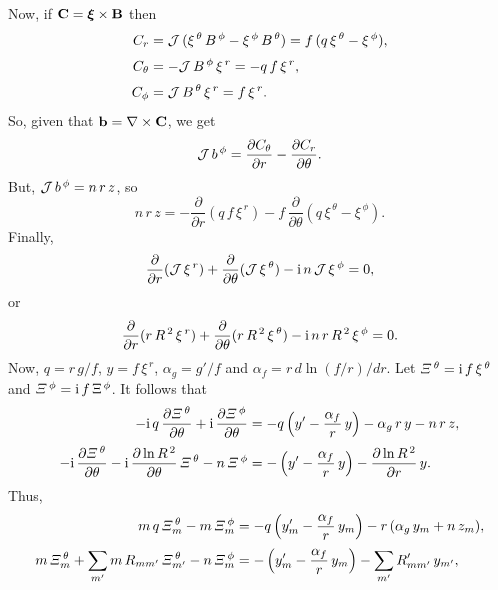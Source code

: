 \documentclass[12pt,prb,aps,notitlepage]{revtex4-1}
\newcommand{\bxi}{\mbox{\boldmath$\xi$}}
\begin{document}
Now, if ${\bf C} = \bxi\times {\bf B}$ then 
\begin{align}
C_r &= {\cal J}\,(\xi^{\,\theta}\,B^{\,\phi} - \xi^{\,\phi}\,B^{\,\theta})= f\,(q\,\xi^{\,\theta}-\xi^{\,\phi}),\\[0.5ex]
C_\theta&= - {\cal J}\,B^{\,\phi}\,\xi^{\,r}=-q\,f\,\xi^{\,r},\\[0.5ex]
C_\phi&= {\cal J}\,B^{\,\theta}\,\xi^{\,r} =f\,\xi^{\,r}.
\end{align}
So, given that ${\bf b}=\nabla\times {\bf C}$, we get
\begin{equation}
{\cal J}\,b^{\,\phi} = \frac{\partial C_\theta}{\partial r} - \frac{\partial C_r}{\partial\theta}.
\end{equation}
But, ${\cal J}\,b^{\,\phi} = n\,r\,z$,  so
\begin{equation}
n\,r\,z =- \frac{\partial}{\partial r} (q\,f\,\xi^{\,r})- f\,\frac{\partial}{\partial\theta}(q\,\xi^{\,\theta}-\xi^{\,\phi}).
\end{equation}
Finally,
\begin{equation}
\frac{\partial}{\partial r}({\cal J}\,\xi^{\,r})+\frac{\partial}{\partial\theta}({\cal J}\,\xi^{\,\theta})- {\rm i}\,n\,{\cal J}\,\xi^{\,\phi} = 0,
\end{equation}
or
\begin{equation}
\frac{\partial}{\partial r}(r\,R^{\,2}\,\xi^{\,r})+\frac{\partial}{\partial\theta}(r\,R^{\,2}\,\xi^{\,\theta})- {\rm i}\,n\,r\,R^{\,2}\,\xi^{\,\phi} = 0.
\end{equation}
Now, $q=r\,g/f$, $y = f\,\xi^{\,r}$, $\alpha_g= g'/f$ and $\alpha_f = r\,d\ln(f/r)/dr$. Let ${\mit\Xi}^{\,\theta} ={\rm i}\, f\,\xi^{\,\theta}$ and ${\mit\Xi}^{\,\phi} ={\rm i}\, f\,\Xi^{\,\phi}$. 
It follows that 
\begin{align}
-{\rm i}\,q\,\frac{\partial{\mit\Xi}^{\,\theta}}{\partial \theta} + {\rm i}\,\frac{\partial{\mit\Xi}^{\,\phi}}{\partial\theta}&=-q\left(y' -\frac{\alpha_f}{r}\,y\right) -\alpha_g\,r\,y-n\,r\,z,\\[0.5ex]
-{\rm i}\,\frac{\partial{\mit\Xi}^{\,\theta}}{\partial\theta}-{\rm i}\,\frac{\partial\ln R^{\,2}}{\partial\theta}\,{\mit\Xi}^{\,\theta} - n\,{\mit\Xi}^{\,\phi}&=
-\left(y' -\frac{\alpha_f}{r}\,y\right)-\frac{\partial\ln R^{\,2}}{\partial r}\,y.
\end{align}
Thus,
\begin{align}
m\,q\,{\mit\Xi}_m^{\,\theta}-m\,{\mit\Xi}^{\,\phi}_m&= -q\left(y_m' -\frac{\alpha_f}{r} \,y_m\right)-r\,(\alpha_g\,y_m+n\,z_m),\\[0.5ex]
m\,{\mit\Xi}_m^{\,\theta}  + \sum_{m'}m\,R_{mm'}\,{\mit\Xi}_{m'}^{\,\theta}-n\,{\mit\Xi}^{\,\phi}_m&= -\left(y_m' - \frac{\alpha_f}{r}\,y_m\right) - \sum_{m'}R_{mm'}'\,y_{m'},
\end{align}
\end{document}

